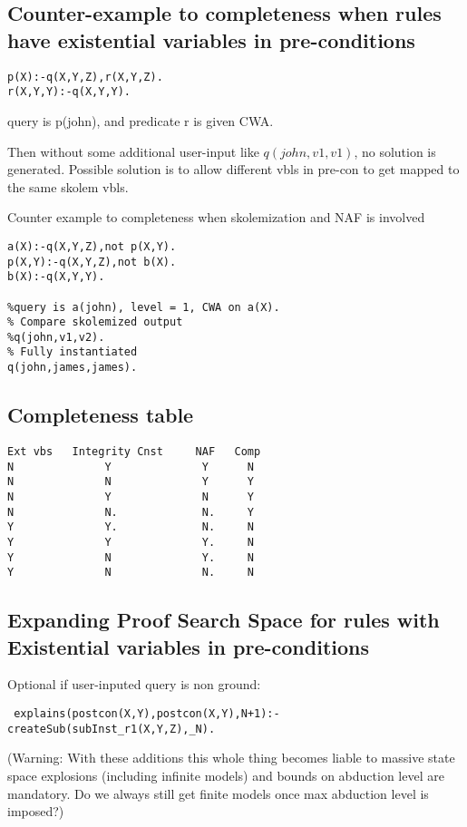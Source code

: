 

\subsection{Counter-example to completeness when rules have existential variables in pre-conditions}
\begin{verbatim}
p(X):-q(X,Y,Z),r(X,Y,Z).
r(X,Y,Y):-q(X,Y,Y).
\end{verbatim}
query is p(john), and predicate r is given CWA. 

Then without some additional user-input like $q(john, v1,v1)$, no solution is generated. Possible solution is to allow different vbls in pre-con to get mapped to the same skolem vbls.

Counter example to completeness when skolemization and NAF is involved
\begin{verbatim}
a(X):-q(X,Y,Z),not p(X,Y).
p(X,Y):-q(X,Y,Z),not b(X).
b(X):-q(X,Y,Y).

%query is a(john), level = 1, CWA on a(X).
% Compare skolemized output
%q(john,v1,v2).
% Fully instantiated
q(john,james,james).    
\end{verbatim}

\subsection{Completeness table}
\begin{verbatim}
Ext vbs   Integrity Cnst     NAF   Comp
N              Y              Y      N
N              N              Y      Y
N              Y              N      Y
N              N.             N.     Y  
Y              Y.             N.     N 
Y              Y              Y.     N
Y              N              Y.     N 
Y              N              N.     N 
\end{verbatim}

\subsection{Expanding Proof Search Space for rules with Existential variables in pre-conditions}

Optional if user-inputed query is non ground:
\begin{verbatim}
 explains(postcon(X,Y),postcon(X,Y),N+1):-createSub(subInst_r1(X,Y,Z),_N).   
\end{verbatim}
(Warning: With these additions this whole thing becomes liable to massive state space explosions (including infinite models) and bounds on abduction level are mandatory. Do we always still get finite models once max abduction level is imposed?)


